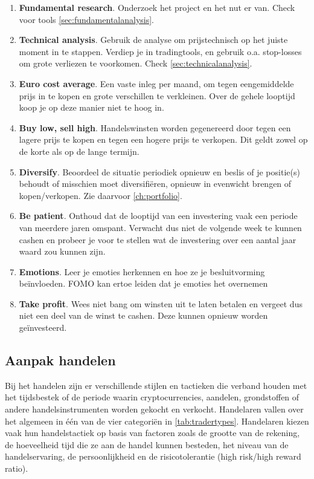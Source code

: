 \begin{enumerate}[label=(\alph*)]
  \setlength\itemsep{0em}
    \item \textbf{Fundamental research}. Onderzoek het project en het nut er van. Check voor tools \cref{sec:fundamentalanalysis}.
    \item \textbf{Technical analysis}. Gebruik de analyse om prijstechnisch op het juiste moment in te stappen. Verdiep je in tradingtools, en gebruik o.a. stop-losses om grote verliezen te voorkomen.  Check \cref{sec:technicalanalysis}.
    \item \textbf{Euro cost average}. Een vaste inleg per maand, om tegen eengemiddelde prijs in te kopen en grote verschillen te verkleinen. Over de gehele looptijd koop je op deze manier niet te hoog in.
    \item \textbf{Buy low, sell high}. Handelswinsten worden gegenereerd door tegen een lagere prijs te kopen en tegen een hogere prijs te verkopen. Dit geldt zowel op de korte als op de lange termijn.
    \item \textbf{Diversify}. Beoordeel de situatie periodiek opnieuw en beslis of je positie(s) behoudt of misschien moet diversifi\"eren, opnieuw in evenwicht brengen of kopen/verkopen. Zie daarvoor \cref{ch:portfolio}.
    \item \textbf{Be patient}. Onthoud dat de looptijd van een investering vaak een periode van meerdere jaren omspant. Verwacht dus niet de volgende week te kunnen cashen en probeer je voor te stellen wat de investering over een aantal jaar waard zou kunnen zijn.
    \item \textbf{Emotions}. Leer je emoties herkennen en hoe ze je besluitvorming be\"invloeden. FOMO kan ertoe leiden dat je emoties het overnemen
    \item \textbf{Take profit}. Wees niet bang om winsten uit te laten betalen en vergeet dus niet een deel van de winst te cashen. Deze kunnen opnieuw worden ge{\"i}nvesteerd.
    
\end{enumerate}

\subsection{Aanpak handelen}
Bij het handelen zijn er verschillende stijlen en tactieken die verband houden met het tijdsbestek of de periode waarin cryptocurrencies, aandelen, grondstoffen of andere handelsinstrumenten worden gekocht en verkocht. Handelaren vallen over het algemeen in \'e\'en van de vier categori\"en in \cref{tab:tradertypes}. Handelaren kiezen vaak hun handelstactiek op basis van factoren zoals de grootte van de rekening, de hoeveelheid tijd die ze aan de handel kunnen besteden, het niveau van de handelservaring, de persoonlijkheid en de risicotolerantie (high risk/high reward ratio).


